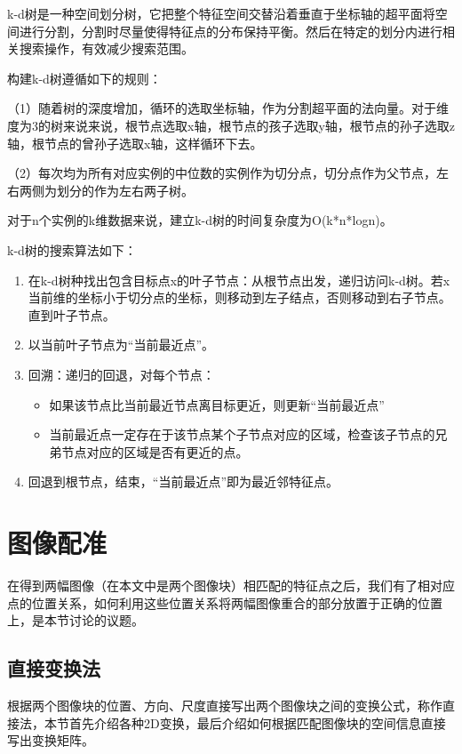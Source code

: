 k-d树是一种空间划分树，它把整个特征空间交替沿着垂直于坐标轴的超平面将空间进行分割，分割时尽量使得特征点的分布保持平衡。然后在特定的划分内进行相关搜索操作，有效减少搜索范围。

构建k-d树遵循如下的规则：

（1）随着树的深度增加，循环的选取坐标轴，作为分割超平面的法向量。对于维度为3的树来说来说，根节点选取x轴，根节点的孩子选取y轴，根节点的孙子选取z轴，根节点的曾孙子选取x轴，这样循环下去。

（2）每次均为所有对应实例的中位数的实例作为切分点，切分点作为父节点，左右两侧为划分的作为左右两子树。

对于n个实例的k维数据来说，建立k-d树的时间复杂度为O(k*n*logn)。

k-d树的搜索算法如下\cite{李航2012统计学习方法}：
\begin{enumerate}
\item 在k-d树种找出包含目标点x的叶子节点：从根节点出发，递归访问k-d树。若x当前维的坐标小于切分点的坐标，则移动到左子结点，否则移动到右子节点。直到叶子节点。
\item 以当前叶子节点为“当前最近点”。
\item 回溯：递归的回退，对每个节点：

	\begin{itemize}
	\item 如果该节点比当前最近节点离目标更近，则更新“当前最近点”
	\item 当前最近点一定存在于该节点某个子节点对应的区域，检查该子节点的兄弟节点对应的区域是否有更近的点。
	\end{itemize}

\item 回退到根节点，结束，“当前最近点”即为最近邻特征点。
\end{enumerate}
\section{图像配准}

在得到两幅图像（在本文中是两个图像块）相匹配的特征点之后，我们有了相对应点的位置关系，如何利用这些位置关系将两幅图像重合的部分放置于正确的位置上，是本节讨论的议题。

\subsection{直接变换法}
根据两个图像块的位置、方向、尺度直接写出两个图像块之间的变换公式，称作直接法，本节首先介绍各种2D变换，最后介绍如何根据匹配图像块的空间信息直接写出变换矩阵。

